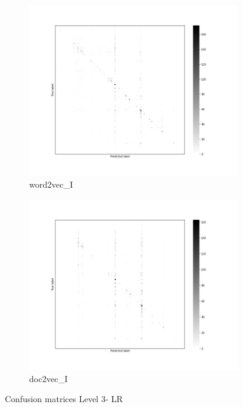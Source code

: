 \documentclass[12pt, a4paper, titlepage]{article}
\begin{document}
\begin{figure}
  \begin{subfigure}[b]{0.475\textwidth}   
    \centering 
    \includegraphics[width=\textwidth]{cm_word2vec_without_LR_3.jpg}
    {{\small word2vec\_I}}    
  \end{subfigure}
  \hfill
  \begin{subfigure}[b]{0.475\textwidth}   
      \centering 
      \includegraphics[width=\textwidth]{cm_doc2vec_without_LR_3.jpg}
      {{\small doc2vec\_I}}    
  \end{subfigure}
  \caption{\label{fig: F21} Confusion matrices Level 3- \ac{LR}}
\end{figure}
\end{document}
